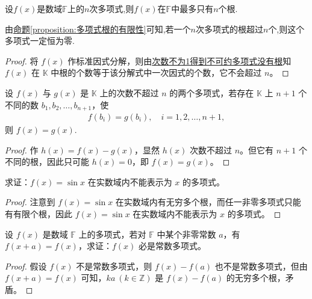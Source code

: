\documentclass[../../main.tex]{subfiles}%
\begin{document}
\begin{theorem}[多项式根的有限性]\label{theorem:多项式根的有限性}
设\(f(x)\)是数域\(\mathbb{F}\)上的\(n\)次多项式,则\(f(x)\)在\(\mathbb{F}\)中最多只有\(n\)个根.
\end{theorem}
\begin{note}
由\hyperref[proposition:多项式根的有限性]{命题\ref{proposition:多项式根的有限性}}可知,若一个$n$次多项式的根超过$n$个,则这个多项式一定恒为零.
\end{note}
\begin{proof}

将 $f(x)$ 作标准因式分解，则由\hyperref[lemma:次数不为1得到不可约多项式没有根]{次数不为1得到不可约多项式没有根}知 $f(x)$ 在 $\mathbb{K}$ 中根的个数等于该分解式中一次因式的个数，它不会超过 $n$。

\end{proof}

\begin{corollary}[两个多项式相等的判定准则]\label{corollary:两个多项式相等的判定准则}
设 $f(x)$ 与 $g(x)$ 是 $\mathbb{K}$ 上的次数不超过 $n$ 的两个多项式，若存在 $\mathbb{K}$ 上 $n + 1$ 个不同的数 $b_1, b_2, \ldots, b_{n+1}$，使
\begin{align*}
f(b_i) = g(b_i), \quad i = 1, 2, \ldots, n + 1,
\end{align*}
则 $f(x) = g(x)$.
\end{corollary}
\begin{proof}

作 $h(x) = f(x) - g(x)$，显然 $h(x)$ 次数不超过 $n$。但它有 $n + 1$ 个不同的根，因此只可能 $h(x) = 0$，即 $f(x) = g(x)$。

\end{proof}

\begin{example}
求证：$f(x) = \sin x$ 在实数域内不能表示为 $x$ 的多项式。
\end{example}
\begin{proof}

注意到 $f(x) = \sin x$ 在实数域内有无穷多个根，而任一非零多项式只能有有限个根，因此 $f(x) = \sin x$ 在实数域内不能表示为 $x$ 的多项式。

\end{proof}

\begin{example}
设 $f(x)$ 是数域 $\mathbb{F}$ 上的多项式，若对 $\mathbb{F}$ 中某个非零常数 $a$，有 $f(x + a) = f(x)$，求证：$f(x)$ 必是常数多项式。
\end{example}
\begin{proof}

假设 $f(x)$ 不是常数多项式，则 $f(x) - f(a)$ 也不是常数多项式，但由 $f(x + a) = f(x)$ 可知，$ka \ (k \in \mathbb{Z})$ 是 $f(x) - f(a)$ 的无穷多个根，矛盾。

\end{proof}
\end{document}
